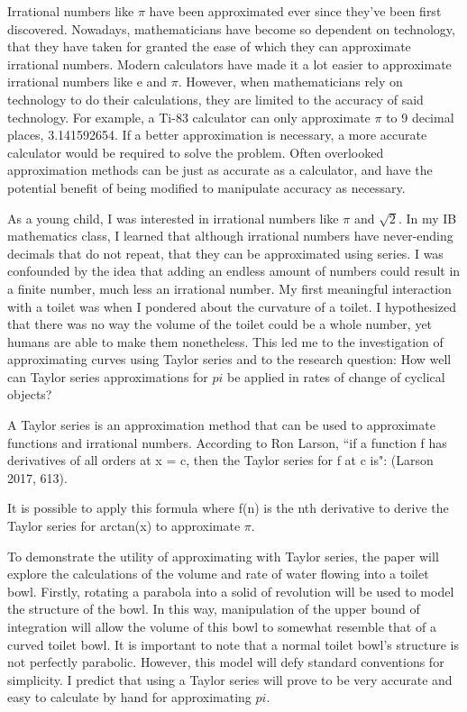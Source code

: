 Irrational numbers like \(\pi\) have been approximated ever since they've been first discovered. Nowadays, mathematicians have become so dependent on technology, that they have taken for granted the ease of which they can approximate irrational numbers. Modern calculators have made it a lot easier to approximate irrational numbers like e and \(\pi\). However, when mathematicians rely on technology to do their calculations, they are limited to the accuracy of said technology. For example, a Ti-83 calculator can only approximate \(\pi\) to 9 decimal places, 3.141592654. If a better approximation is necessary, a more accurate calculator would be required to solve the problem. Often overlooked approximation methods can be just as accurate as a calculator, and have the potential benefit of being modified to manipulate accuracy as necessary.

As a young child, I was interested in irrational numbers like \(\pi\) and \(\sqrt{2}\). In my IB mathematics class, I learned that although irrational numbers have never-ending decimals that do not repeat, that they can be approximated using series. I was confounded by the idea that adding an endless amount of numbers could result in a finite number, much less an irrational number. My first meaningful interaction with a toilet was when I pondered about the curvature of a toilet. I hypothesized that there was no way the volume of the toilet could be a whole number, yet humans are able to make them nonetheless. This led me to the investigation of approximating curves using Taylor series and to the research question: How well can Taylor series approximations for \(pi\) be applied in rates of change of cyclical objects?

A Taylor series is an approximation method that can be used to approximate functions and irrational numbers. According to Ron Larson, ``if a function f has derivatives of all orders at x = c, then the Taylor series for f at c is": (Larson 2017, 613).

It is possible to apply this formula where f(n) is the nth derivative to derive the Taylor series for arctan(x) to approximate \(\pi\).

To demonstrate the utility of approximating with Taylor series, the paper will explore the calculations of the volume and rate of water flowing into a toilet bowl. Firstly, rotating a parabola into a solid of revolution will be used to model the structure of the bowl. In this way, manipulation of the upper bound of integration will allow the volume of this bowl to somewhat resemble that of a curved toilet bowl. It is important to note that a normal toilet bowl's structure is not perfectly parabolic. However, this model will defy standard conventions for simplicity. I predict that using a Taylor series will prove to be very accurate and easy to calculate by hand for approximating \(pi\). 

